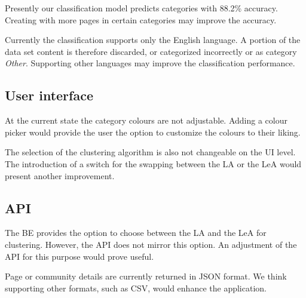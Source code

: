 Presently our classification model predicts categories with 88.2\% accuracy. Creating with more pages in certain categories may improve the accuracy. 

Currently the classification supports only the English language. A portion of the data set content is therefore discarded, or categorized incorrectly or as category \textit{Other}. Supporting other languages may improve the classification performance. 

\subsection{User interface}

At the current state the category colours are not adjustable. Adding a colour picker would provide the user the option to customize the colours to their liking.

The selection of the clustering algorithm is also not changeable on the UI level. The introduction of a switch for the swapping between the LA or the LeA would present another improvement.
\subsection{API}

The BE provides the option to choose between the LA and the LeA for clustering. However, the API does not mirror this option. An adjustment of the API for this purpose would prove useful. 

Page or community details are currently returned in JSON format. We think supporting other formats, such as CSV, would enhance the application.
